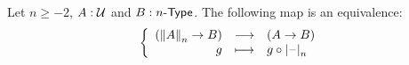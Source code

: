 \documentclass[hott-all.tex]{subfiles}
\begin{document}
% 
% 
% 
\begin{lem}
  Let $n\ge-2$, $A:\type$ and $B:\typele{n}$. The following map is an
  equivalence:
  \[\function{(\trunc nA\to{}B)}{(A\to{}B)}{g}{g\circ\tprojf n}\]
\end{lem}
% 
% 
\end{document}
